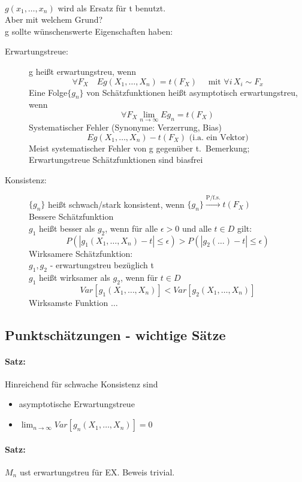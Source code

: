 \documentclass[a4paper,12pt]{scrartcl}
\begin{document}
  \\
  $g(x_1,\dots,x_n)$ wird als Ersatz für t benutzt.\\
  Aber mit welchem Grund?\\
  g sollte wünschenswerte Eigenschaften haben:
  \begin{description}
   \item[Erwartungstreue:] g heißt erwartungstreu, wenn
   $$\forall F_X\quad Eg(X_1,\dots,X_n) = t(F_X)\quad\text{ mit } \forall i\, X_i\sim F_x$$
   Eine Folge$\{g_n\}$ von Schätzfunktionen heißt asymptotisch erwartungstreu, wenn
   $$\forall F_X \lim_{n\rightarrow\infty}Eg_n = t(F_X)$$
   Systematischer Fehler (Synonyme: Verzerrung, Bias)
   $$Eg(X_1,\dots,X_n) - t(F_X)\text{ (i.a. ein Vektor)} $$
   Meist systematischer Fehler von g gegenüber t.\
   Bemerkung; Erwartungstreue Schätzfunktionen sind biasfrei
   \item[Konsistenz:] $\{g_n\}$ heißt schwach/stark konsistent, wenn $\{g_n\}\overset{\text{P/f.s.}}{\rightarrow}t(F_X)$\\
   Bessere Schätzfunktion\\
   $g_1$ heißt besser als $g_2$, wenn für alle $\epsilon>0$ und alle $t\in D$ gilt:
   $$P(|g_1(X_1,\dots,X_n)-t|\leq \epsilon)>P(|g_2(\dots)-t|\leq \epsilon) $$
   Wirksamere Schätzfunktion:\\
   $g_1,g_2$ - erwartungstreu bezüglich t\\
   $g_1$ heißt wirksamer als $g_2$, wenn für $t\in D$
   $$Var[g_1(X_1,\dots,X_n)]<Var[g_2(X_1,\dots,X_n)]$$
   Wirksamste Funktion $\dots$
  \end{description}
  
  \subsection{Punktschätzungen  - wichtige Sätze}
  
  \paragraph{Satz:} Hinreichend für schwache Konsistenz sind
  \begin{itemize}
   \item asymptotische Erwartungstreue
   \item $\lim_{n\rightarrow\infty}Var[g_n(X_1,\dots,X_n)]=0$
  \end{itemize}
  \paragraph{Satz:} $M_n$ ust erwartungstreu für EX. Beweis trivial.\\
\end{document}
